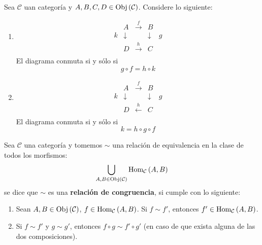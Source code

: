 \documentclass[12pt]{report}
\theoremstyle{largebreak}
\newcommand{\Obj}[1]{\ensuremath{\textup{Obj}\left(#1\right)}}
\newcommand{\Hom}[3]{\ensuremath{\textup{Hom}_{#1}\left(#2,#3\right)}}
\begin{document}
    \begin{exa}
        Sea $\mathcal{C}$ uan categoría y $A,B,C,D\in\Obj{\mathcal{C}}$.
        Considere lo siguiente:
        \begin{enumerate}
            \item \begin{equation*}
                \begin{array}{lcccr}
                   & A & \overset{f}{\longrightarrow} & B & \\
                  k & \downarrow &  & \downarrow & g\\
                  & D & \overset{h}{\longrightarrow} & C & \\
                \end{array}
            \end{equation*}
            El diagrama conmuta si y sólo si
            \begin{equation*}
                g\circ f = h\circ k
            \end{equation*}
            \item \begin{equation*}
                \begin{array}{lcccr}
                   & A & \overset{f}{\longrightarrow} & B & \\
                  k & \downarrow &  & \downarrow & g\\
                  & D & \overset{h}{\longleftarrow} & C & \\
                \end{array}
            \end{equation*}
            El diagrama conmuta si y sólo si
            \begin{equation*}
                k=h\circ g\circ f
            \end{equation*}
        \end{enumerate}
    \end{exa}

    \begin{mydef}
        Sea $\mathcal{C}$ una categoría y tomemos $\sim$ una relación de equivalencia en la clase de todos los morfismos:
        \begin{equation*}
            \bigcup_{A,B\in\Obj{\mathcal{C}}}\Hom{\mathcal{C}}{A}{B}
        \end{equation*}
        se dice que $\sim$ es una \textbf{relación de congruencia}, si cumple con lo siguiente:
        \begin{enumerate}
            \item Sean $A,B\in\Obj{\mathcal{C}}$, $f\in\Hom{\mathcal{C}}{A}{B}$. Si $f\sim f'$, entonces $f'\in\Hom{\mathcal{C}}{A}{B}$.
            \item Si $f\sim f'$ y $g\sim g'$, entonces $f\circ g\sim f'\circ g'$ (en caso de que exista alguna de las dos composiciones).
        \end{enumerate}
    \end{mydef}
\end{document}
